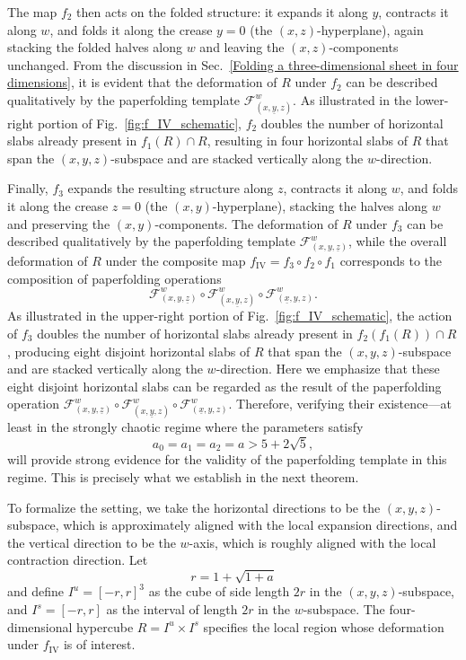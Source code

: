 \documentclass[12pt]{iopart}
\begin{document}
The map $f_2$ then acts on the folded structure: it expands it along $y$, contracts it along $w$, and folds it along the crease $y=0$ (the $(x,z)$-hyperplane), again stacking the folded halves along $w$ and leaving the $(x,z)$-components unchanged. From the discussion in Sec.~\ref{Folding a three-dimensional sheet in four dimensions}, it is evident that the deformation of $R$ under $f_2$ can be described qualitatively by the paperfolding template $\mathcal{F}^w_{(x,\underline{y},z)}$. As illustrated in the lower-right portion of Fig.~\ref{fig:f_IV_schematic}, $f_2$ doubles the number of horizontal slabs already present in $f_1(R)\cap R$, resulting in four horizontal slabs of $R$ that span the $(x,y,z)$-subspace and are stacked vertically along the $w$-direction.

Finally, $f_3$ expands the resulting structure along $z$, contracts it along $w$, and folds it along the crease $z=0$ (the $(x,y)$-hyperplane), stacking the halves along $w$ and preserving the $(x,y)$-components. The deformation of \( R \) under \( f_3 \) can be described qualitatively by the paperfolding template \( \mathcal{F}^w_{(x,y,\underline{z})} \), while the overall deformation of \( R \) under the composite map \( f_{\mathrm{IV}} = f_3 \circ f_2 \circ f_1 \) corresponds to the composition of paperfolding operations  
\begin{equation}
\mathcal{F}^w_{(x,y,\underline{z})} \circ \mathcal{F}^w_{(x,\underline{y},z)} \circ \mathcal{F}^w_{(\underline{x},y,z)}.
\end{equation}
As illustrated in the upper-right portion of Fig.~\ref{fig:f_IV_schematic}, the action of \( f_3 \) doubles the number of horizontal slabs already present in \( f_2(f_1(R)) \cap R \), producing eight disjoint horizontal slabs of \( R \) that span the \((x,y,z)\)-subspace and are stacked vertically along the \( w \)-direction. Here we emphasize that these eight disjoint horizontal slabs can be regarded as the result of the paperfolding operation \(\mathcal{F}^w_{(x,y,\underline{z})} \circ \mathcal{F}^w_{(x,\underline{y},z)} \circ \mathcal{F}^w_{(\underline{x},y,z)}\). Therefore, verifying their existence---at least in the strongly chaotic regime where the parameters satisfy
\[
a_0 = a_1 = a_2 = a > 5 + 2\sqrt{5},
\]
will provide strong evidence for the validity of the paperfolding template in this regime. This is precisely what we establish in the next theorem.

To formalize the setting, we take the horizontal directions to be the \((x,y,z)\)-subspace, which is approximately aligned with the local expansion directions, and the vertical direction to be the \(w\)-axis, which is roughly aligned with the local contraction direction.  
Let  
\[
r = 1 + \sqrt{1+a}
\]  
and define \(I^u = [-r,r]^3\) as the cube of side length \(2r\) in the \((x,y,z)\)-subspace, and \(I^s = [-r,r]\) as the interval of length \(2r\) in the \(w\)-subspace.  
The four-dimensional hypercube \(R = I^u \times I^s\) specifies the local region whose deformation under \( f_{\mathrm{IV}} \) is of interest.  
\end{document}
